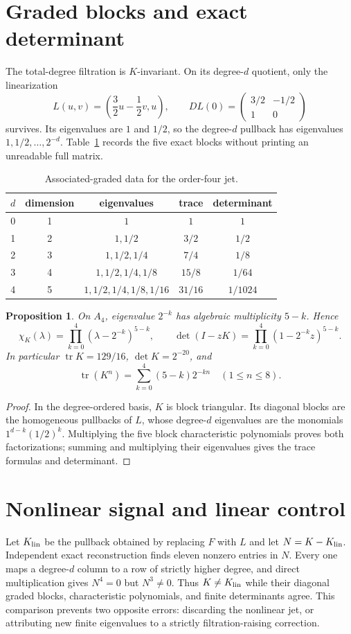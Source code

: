 \documentclass[10pt]{article}
\newtheorem{proposition}{Proposition}
\begin{document}
\section{Graded blocks and exact determinant}
The total-degree filtration is $K$-invariant.  On its degree-$d$ quotient,
only the linearization
\[
 L(u,v)=\left(\frac32u-\frac12v,u\right),\qquad
 DL(0)=\begin{pmatrix}3/2&-1/2\\1&0\end{pmatrix}
\]
survives.  Its eigenvalues are $1$ and $1/2$, so the degree-$d$ pullback has
eigenvalues $1,1/2,\ldots,2^{-d}$.  Table~\ref{tab:blocks} records the five
exact blocks without printing an unreadable full matrix.
\begin{table}[ht]
\centering
\small
\caption{Associated-graded data for the order-four jet.}
\label{tab:blocks}
\begin{tabular}{@{}ccccc@{}}
\toprule
$d$ & dimension & eigenvalues & trace & determinant\\
\midrule
0 & 1 & $1$ & $1$ & $1$\\
1 & 2 & $1,1/2$ & $3/2$ & $1/2$\\
2 & 3 & $1,1/2,1/4$ & $7/4$ & $1/8$\\
3 & 4 & $1,1/2,1/4,1/8$ & $15/8$ & $1/64$\\
4 & 5 & $1,1/2,1/4,1/8,1/16$ & $31/16$ & $1/1024$\\
\bottomrule
\end{tabular}
\end{table}

\begin{proposition}
On $A_4$, eigenvalue $2^{-k}$ has algebraic multiplicity $5-k$.  Hence
\[
 \chi_K(\lambda)=\prod_{k=0}^{4}(\lambda-2^{-k})^{5-k},\qquad
 \det(I-zK)=\prod_{k=0}^{4}(1-2^{-k}z)^{5-k}.
\]
In particular $\operatorname{tr}K=129/16$, $\det K=2^{-20}$, and
\[
 \operatorname{tr}(K^n)=\sum_{k=0}^{4}(5-k)2^{-kn}\quad(1\leq n\leq8).
\]
\end{proposition}
\begin{proof}
In the degree-ordered basis, $K$ is block triangular.  Its diagonal blocks
are the homogeneous pullbacks of $L$, whose degree-$d$ eigenvalues are the
monomials $1^{d-k}(1/2)^k$.  Multiplying the five block characteristic
polynomials proves both factorizations; summing and multiplying their
eigenvalues gives the trace formulas and determinant.
\end{proof}

\section{Nonlinear signal and linear control}
Let $K_{\rm lin}$ be the pullback obtained by replacing $F$ with $L$ and let
$N=K-K_{\rm lin}$.  Independent exact reconstruction finds eleven nonzero
entries in $N$.  Every one maps a degree-$d$ column to a row of strictly
higher degree, and direct multiplication gives $N^4=0$ but $N^3\ne0$.
Thus $K\ne K_{\rm lin}$ while their diagonal graded blocks, characteristic
polynomials, and finite determinants agree.  This comparison prevents two
opposite errors: discarding the nonlinear jet, or attributing new finite
eigenvalues to a strictly filtration-raising correction.
\end{document}
